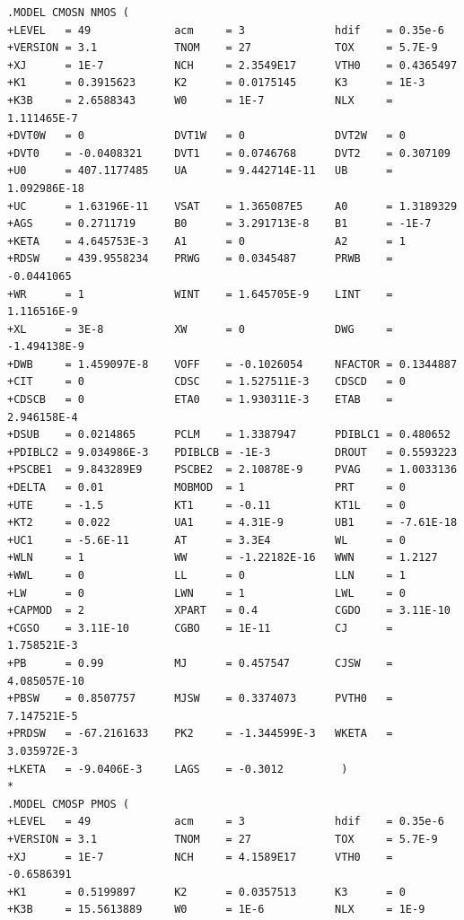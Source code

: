 \documentclass[12pt]{article}
\begin{document}
\begin{lstlisting}
.MODEL CMOSN NMOS (
+LEVEL   = 49             acm     = 3              hdif    = 0.35e-6
+VERSION = 3.1            TNOM    = 27             TOX     = 5.7E-9
+XJ      = 1E-7           NCH     = 2.3549E17      VTH0    = 0.4365497
+K1      = 0.3915623      K2      = 0.0175145      K3      = 1E-3
+K3B     = 2.6588343      W0      = 1E-7           NLX     = 1.111465E-7
+DVT0W   = 0              DVT1W   = 0              DVT2W   = 0
+DVT0    = -0.0408321     DVT1    = 0.0746768      DVT2    = 0.307109
+U0      = 407.1177485    UA      = 9.442714E-11   UB      = 1.092986E-18
+UC      = 1.63196E-11    VSAT    = 1.365087E5     A0      = 1.3189329
+AGS     = 0.2711719      B0      = 3.291713E-8    B1      = -1E-7
+KETA    = 4.645753E-3    A1      = 0              A2      = 1
+RDSW    = 439.9558234    PRWG    = 0.0345487      PRWB    = -0.0441065
+WR      = 1              WINT    = 1.645705E-9    LINT    = 1.116516E-9
+XL      = 3E-8           XW      = 0              DWG     = -1.494138E-9
+DWB     = 1.459097E-8    VOFF    = -0.1026054     NFACTOR = 0.1344887
+CIT     = 0              CDSC    = 1.527511E-3    CDSCD   = 0
+CDSCB   = 0              ETA0    = 1.930311E-3    ETAB    = 2.946158E-4
+DSUB    = 0.0214865      PCLM    = 1.3387947      PDIBLC1 = 0.480652
+PDIBLC2 = 9.034986E-3    PDIBLCB = -1E-3          DROUT   = 0.5593223
+PSCBE1  = 9.843289E9     PSCBE2  = 2.10878E-9     PVAG    = 1.0033136
+DELTA   = 0.01           MOBMOD  = 1              PRT     = 0
+UTE     = -1.5           KT1     = -0.11          KT1L    = 0
+KT2     = 0.022          UA1     = 4.31E-9        UB1     = -7.61E-18
+UC1     = -5.6E-11       AT      = 3.3E4          WL      = 0
+WLN     = 1              WW      = -1.22182E-16   WWN     = 1.2127
+WWL     = 0              LL      = 0              LLN     = 1
+LW      = 0              LWN     = 1              LWL     = 0
+CAPMOD  = 2              XPART   = 0.4            CGDO    = 3.11E-10
+CGSO    = 3.11E-10       CGBO    = 1E-11          CJ      = 1.758521E-3
+PB      = 0.99           MJ      = 0.457547       CJSW    = 4.085057E-10
+PBSW    = 0.8507757      MJSW    = 0.3374073      PVTH0   = 7.147521E-5
+PRDSW   = -67.2161633    PK2     = -1.344599E-3   WKETA   = 3.035972E-3
+LKETA   = -9.0406E-3     LAGS    = -0.3012         )
*
.MODEL CMOSP PMOS (
+LEVEL   = 49             acm     = 3              hdif    = 0.35e-6
+VERSION = 3.1            TNOM    = 27             TOX     = 5.7E-9
+XJ      = 1E-7           NCH     = 4.1589E17      VTH0    = -0.6586391
+K1      = 0.5199897      K2      = 0.0357513      K3      = 0
+K3B     = 15.5613889     W0      = 1E-6           NLX     = 1E-9

\end{lstlisting}
\end{document}
